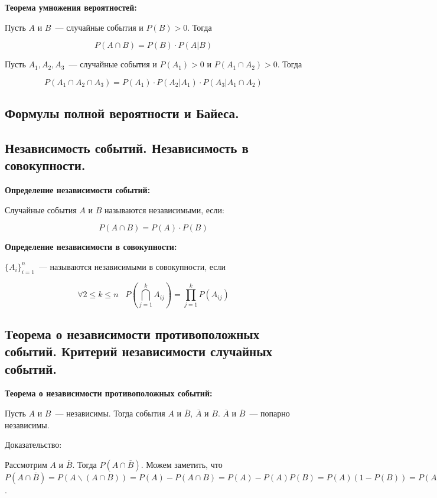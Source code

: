 \textbf{Теорема умножения вероятностей:}
    \smallskip
    
    Пусть $A$ и $B$~--- случайные события и $P(B) > 0$. Тогда 

    \[
        P(A \cap B) = P(B) \cdot P(A|B)  
    \]
    \bigskip

    Пусть $A_1, A_2, A_3$~--- случайные события и $P(A_1) > 0$ и $P(A_1 \cap A_2) > 0$.
    Тогда

    \[
        P(A_1 \cap A_2 \cap A_3) = P(A_1) \cdot P(A_2|A_1) \cdot P(A_3|A_1 \cap A_2)  
    \]

\subsection{Формулы полной вероятности и Байеса.}

\subsection{Независимость событий. Независимость в совокупности.}

\textbf{Определение независимости событий:}
    \smallskip

    Случайные события $A$ и $B$ называются независимыми, если:

    \[
        P(A \cap B) = P(A) \cdot P(B)   
    \]
    \bigskip

\textbf{Определение независимости в совокупности:}
    \smallskip

    $\{A_i\}^{n}_{i = 1}$~--- называются независимыми в совокупности, если

    \[
        \forall 2 \leq k \leq n \;\;\; P (\bigcap^{k}_{j = 1}A_{ij}) =
        \prod^{k}_{j = 1} P(A_{ij}) 
    \]

\subsection{Теорема о независимости противоположных событий. Критерий
независимости случайных событий.}

\textbf{Теорема о независимости противоположных событий:}
    \smallskip

    Пусть $A$ и $B$~--- независимы. Тогда события $A$ и $\overline{B}$,
    $\overline{A}$ и $B$. $\overline{A}$ и $\overline{B}$~--- попарно
    независимы.
    \bigskip

    Доказательство:
    \bigskip

    Рассмотрим $A$ и $\overline{B}$. Тогда $P(A \cap 
    \overline{B})$. Можем заметить, что $P(A \cap \overline{B}) = 
    P(A \backslash (A \cap B)) = P(A) - P(A \cap B) = P(A) - P(A) P(B) =
    P(A)(1 - P(B)) = P(A) P(\overline{B})$.

